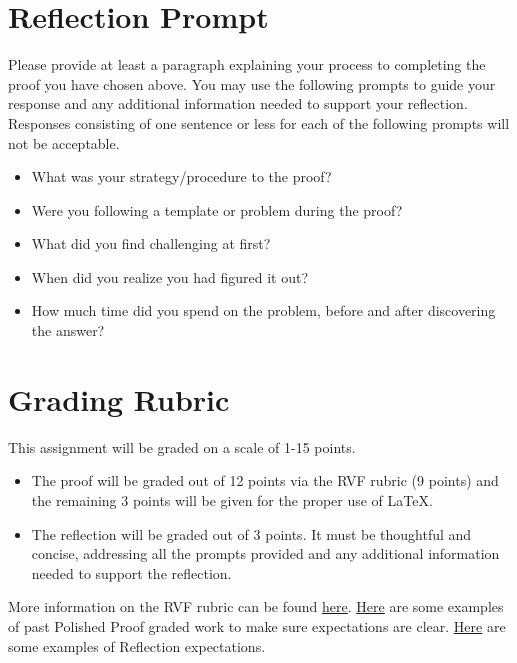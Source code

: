 \documentclass{article}
\theoremstyle{definition}
\begin{document}
\section*{Reflection Prompt}
    Please provide at least a paragraph explaining your process to completing the proof you have chosen above. You may use the following prompts to guide your response and any additional information needed to support your reflection. Responses consisting of one sentence or less for each of the following prompts will not be acceptable.
    \begin{itemize}
        \item What was your strategy/procedure to the proof?
        \item Were you following a template or problem during the proof?
        \item What did you find challenging at first?
        \item When did you realize you had figured it out?
        \item How much time did you spend on the problem, before and after discovering the answer?
    \end{itemize}

\section*{Grading Rubric}
    This assignment will be graded on a scale of 1-15 points.
    \begin{itemize}
    \item The proof will be graded out of 12 points via the RVF rubric (9 points) and the remaining 3 points will be given for the proper use of \LaTeX.
    \item The reflection will be graded out of 3 points. It must be thoughtful and concise, addressing all the prompts provided and any additional information needed to support the reflection.
    \end{itemize}
     
    More information on the RVF rubric can be found 
    \href{https://drive.google.com/file/d/1P0OBjw-GkX64uCpYcqYmXARapf9MwaiI/view?usp=sharing}{here}. 
    \href{https://drive.google.com/file/d/14zLx8TDPdD8shbwgMGPAAWdQrUZDz1jd/view?usp=share_link}{Here} 
    are some examples of past Polished Proof graded work to make sure expectations are clear. \href{https://docs.google.com/document/d/1GcCZI_ueOWXlBC9xIBietOw1uEzFIyg-TzuHvbCZumU/edit?usp=sharing}{Here} are some examples of Reflection expectations.

	
\end{document}
